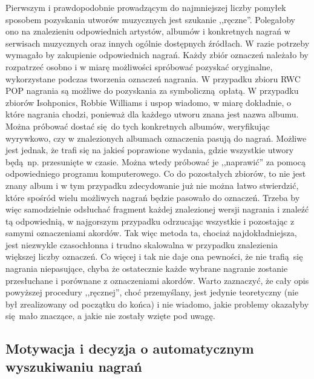 Pierwszym i prawdopodobnie prowadzącym do najmniejszej liczby pomyłek sposobem pozyskania utworów muzycznych jest szukanie ,,ręczne''. Polegałoby ono na znalezieniu odpowiednich artystów, albumów i konkretnych nagrań w serwisach muzycznych oraz innych ogólnie dostępnych źródłach. W razie potrzeby wymagało by zakupienie odpowiednich nagrań. Każdy zbiór oznaczeń należało by rozpatrzeć osobno i w miarę możliwości spróbować pozyskać oryginalne, wykorzystane podczas tworzenia oznaczeń nagrania. W przypadku zbioru RWC POP nagrania są możliwe do pozyskania za symboliczną opłatą. W przypadku zbiorów Isohponics, Robbie Williams i uspop wiadomo, w miarę dokładnie, o które nagrania chodzi, ponieważ dla każdego utworu znana jest nazwa albumu. Można próbować dostać się do tych konkretnych albumów, weryfikując wyrywkowo, czy w znalezionych albumach oznaczenia pasują do nagrań. Możliwe jest jednak, że trafi się na jakieś poprawione wydania, gdzie wszystkie utwory będą np. przesunięte w czasie. Można wtedy próbować je ,,naprawić'' za pomocą odpowiedniego programu komputerowego. Co do pozostałych zbiorów, to nie jest znany album i w tym przypadku zdecydowanie już nie można łatwo stwierdzić, które spośród wielu możliwych nagrań będzie pasowało do oznaczeń. Trzeba by więc samodzielnie odsłuchać fragment każdej znalezionej wersji nagrania i znaleźć tą odpowiednią, w najgorszym przypadku odrzucając wszystkie i pozostając z samymi oznaczeniami akordów. Tak więc metoda ta, chociaż najdokładniejsza, jest niezwykle czasochłonna i trudno skalowalna w przypadku znalezienia większej liczby oznaczeń.  Co więcej i tak nie daje ona pewności, że nie trafią się nagrania niepasujące, chyba że ostatecznie każde wybrane nagranie zostanie przesłuchane i porównane z oznaczeniami akordów. Warto zaznaczyć, że cały opis powyższej procedury ,,ręcznej'', choć przemyślany, jest jedynie teoretyczny (nie był zrealizowany od początku do końca) i nie wiadomo, jakie problemy okazałyby się mało znaczące, a jakie nie zostały wzięte pod uwagę. 

\subsection{Motywacja i decyzja o automatycznym wyszukiwaniu nagrań}

